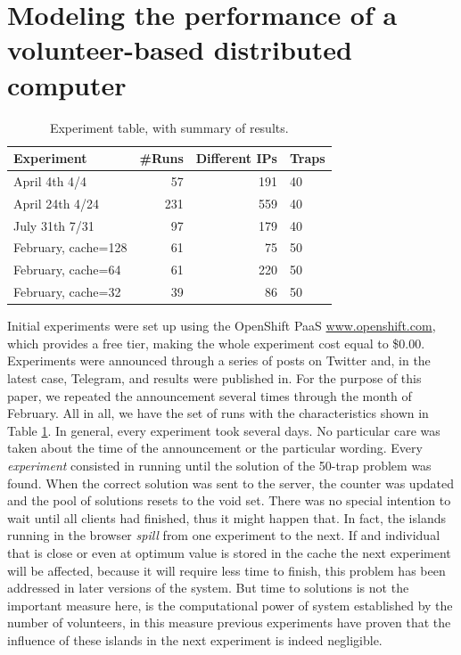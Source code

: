 \documentclass[letterpaper]{article}
\begin{document}
\section{Modeling the performance of a volunteer-based distributed computer} 
\label{sec:experiments}

\begin{table}[htb]
\caption{Experiment table, with summary of results. \label{tab:runs}}
\begin{center}
\begin{tabular}{l|rrl}
\hline
Experiment & \#Runs & Different IPs & Traps \\
\hline
April 4th 4/4 & 57 & 191 & 40 \\
April 24th 4/24 &  231 & 559& 40  \\
July 31th 7/31 & 97 & 179 & 40 \\
\hline
February, cache=128 & 61 & 75 & 50  \\
February, cache=64 & 61 & 220 & 50  \\
February, cache=32 & 39 & 86 & 50  \\
\hline
\end{tabular}
\end{center}
\end{table}
%
Initial experiments were set up using the OpenShift
PaaS \url{www.openshift.com}, which provides a free tier, making the whole experiment cost
equal to \$0.00. Experiments were
announced through a series of posts on Twitter and, in the latest case, Telegram, and
results were published in\citep{DBLP:conf/gecco/GuervosG15}. For the
purpose of this paper, we repeated the announcement several times
through the month of February. All  %
in all, we have the set of runs with the characteristics shown in
Table \ref{tab:runs}. In general, every experiment took several
days. No particular care was taken about the time of the announcement
or the particular wording. Every {\em experiment} consisted in running
until the solution of the 50-trap problem was found. When the correct
solution was sent to the server, the counter was updated and the pool
of solutions resets to the void set. There was no special intention to wait
until all clients had finished, thus it might happen that. In fact,
the islands running in the browser {\em spill} from one experiment to
the next. 
If and individual that is close or even at optimum value is stored in the cache 
the next experiment will be affected, because it will require less time 
to finish, this problem has been addressed in later versions of the system. 
But time to solutions is not the important measure here, is the computational
power of system established by the number of volunteers, in this measure 
previous experiments have proven that the influence
of these islands in the next experiment is indeed negligible. 
\end{document}
